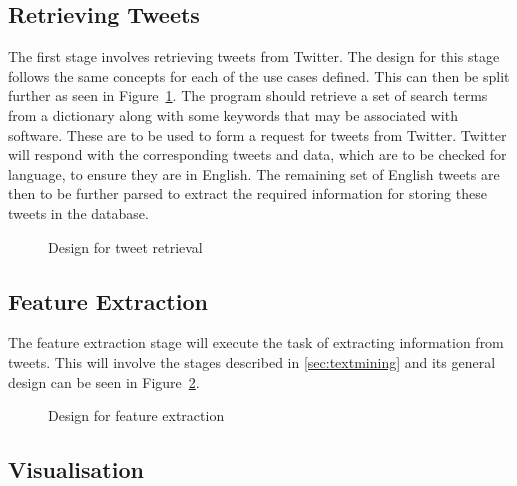 \subsection{Retrieving Tweets}
\label{sec:arc1}
The first stage involves retrieving tweets from Twitter. The design for this stage follows the same concepts for each of the use cases defined. This can then be split further as seen in Figure~\ref{fig:phase1}. The program should retrieve a set of search terms from a dictionary along with some keywords that may be associated with software. These are to be used to form a request for tweets from Twitter. Twitter will respond with the corresponding tweets and data, which are to be checked for language, to ensure they are in English. The remaining set of English tweets are then to be further parsed to extract the required information for storing these tweets in the database.

\begin{figure}[h]
  \centering
  
  \caption{Design for tweet retrieval
    \label{fig:phase1}}
\end{figure}



\subsection{Feature Extraction}
\label{sec:arc2}
The feature extraction stage will execute the task of extracting information from tweets. This will involve the stages described in \ref{sec:textmining} and its general design can be seen in Figure~\ref{fig:phase2}.

\begin{figure}[h]
  \centering
  
  \caption{Design for feature extraction
    \label{fig:phase2}}
\end{figure}

\subsection{Visualisation}
\label{sec:arc3}
